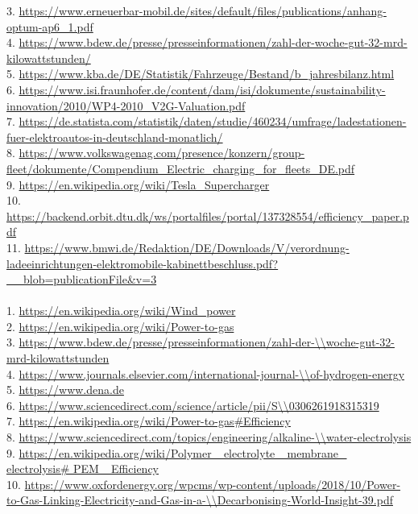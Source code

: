 \begin{parcolumns}[colwidths={1=2.5 cm, 2=12 cm}]{2}
{3. \url{https://www.erneuerbar-mobil.de/sites/default/files/publications/anhang-optum-ap6_1.pdf} \\
4. \url{https://www.bdew.de/presse/presseinformationen/zahl-der-woche-gut-32-mrd-kilowattstunden/} \\
5. \url{https://www.kba.de/DE/Statistik/Fahrzeuge/Bestand/b_jahresbilanz.html} \\
6. \url{https://www.isi.fraunhofer.de/content/dam/isi/dokumente/sustainability-innovation/2010/WP4-2010_V2G-Valuation.pdf} \\
7. \url{https://de.statista.com/statistik/daten/studie/460234/umfrage/ladestationen-fuer-elektroautos-in-deutschland-monatlich/} \\
8. \url{https://www.volkswagenag.com/presence/konzern/group-fleet/dokumente/Compendium_Electric_charging_for_fleets_DE.pdf} \\
9. \url{https://en.wikipedia.org/wiki/Tesla_Supercharger} \\
10. \url{https://backend.orbit.dtu.dk/ws/portalfiles/portal/137328554/efficiency_paper.pdf} \\
11. \url{https://www.bmwi.de/Redaktion/DE/Downloads/V/verordnung-ladeeinrichtungen-elektromobile-kabinettbeschluss.pdf?__blob=publicationFile&v=3} \\
\\
1. \url{https://en.wikipedia.org/wiki/Wind_power}\\
2. \url{https://en.wikipedia.org/wiki/Power-to-gas}\\
3. \url{https://www.bdew.de/presse/presseinformationen/zahl-der-\\woche-gut-32-mrd-kilowattstunden} \\
4. \url{https://www.journals.elsevier.com/international-journal-\\of-hydrogen-energy}\\
5. \url{https://www.dena.de}\\
6. \url{https://www.sciencedirect.com/science/article/pii/S\\0306261918315319}\\
7. \url{https://en.wikipedia.org/wiki/Power-to-gas\#Efficiency}\\ 
8. \url{https://www.sciencedirect.com/topics/engineering/alkaline-\\water-electrolysis}\\
9. \url{https://en.wikipedia.org/wiki/Polymer\_ electrolyte\_ membrane\_ electrolysis\# PEM\_ Efficiency}\\
10. \url{https://www.oxfordenergy.org/wpcms/wp-content/uploads/2018/10/Power-to-Gas-Linking-Electricity-and-Gas-in-a-\\Decarbonising-World-Insight-39.pdf}\\
}
\end{parcolumns}
